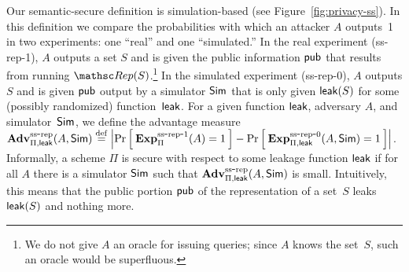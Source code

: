 Our semantic-secure definition is simulation-based (see
Figure~\ref{fig:privacy-ss}).
In this definition we compare the probabilities with which an attacker $A$ outputs~1
in two experiments: one ``real'' and one ``simulated.''
In the real experiment (ss-rep-1), $A$ outputs a set $S$ and is given the
public information ${\sf pub}$ that results from running $\Rep(S)$.\footnote{We do not give $A$ an oracle for
issuing queries; since $A$ knows the set~$S$, such an oracle would be superfluous.
}
 
In the simulated experiment (ss-rep-0), $A$ outputs $S$ and is given ${\sf pub}$ output
by a simulator ${\sf Sim}$ that is only given ${\sf leak}(S)$ for some (possibly randomized)
function~${\sf leak}$. 
For a given function ${\sf leak}$, adversary $A$, and simulator~${\sf Sim}$,
we define the advantage measure
$\mathrm{\mathbf{Adv}}^{\mathrm{ss\mbox{-}rep}}_{\Pi,{\sf leak}}(A,{\sf Sim}) \stackrel{\rm def}{=}
\left| \Pr\left[\: \mathrm{\mathbf{Exp}}^{\mathrm{ss\mbox{-}rep\mbox{-}1}}_{\Pi}(A)=1 \:\right] -
\Pr\left[\: \mathrm{\mathbf{Exp}}^{\mathrm{ss\mbox{-}rep\mbox{-}0}}_{\Pi,{\sf leak}}(A, {\sf Sim})=1 \:\right] \right|$.
Informally, a scheme $\Pi$ is secure with respect to some leakage function ${\sf leak}$
if for all $A$ there is a simulator ${\sf Sim}$ such that
$\mathrm{\mathbf{Adv}}^{\mathrm{ss\mbox{-}rep}}_{\Pi,{\sf leak}}(A,{\sf Sim})$ is small.
Intuitively, this means that the public portion
${\sf pub}$ of the representation of a set~$S$ leaks~${\sf leak}(S)$ and nothing more.

